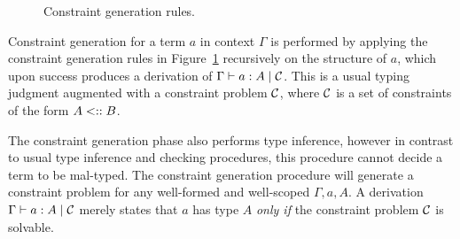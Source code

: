 \documentclass[pdflatex,sn-mathphys-num]{sn-jnl}%
\theoremstyle{thmstyleone}%
\theoremstyle{thmstyletwo}%
\theoremstyle{thmstylethree}%
\begin{document}
\begin{figure}[tb]
\begin{mathpar}


  \end{mathpar}

  \caption{Constraint generation rules.}
  \label{fig:constraint-generation-rules}
\end{figure}

Constraint generation for a term $a$ in context $\Gamma$ is performed by applying the constraint generation rules in Figure~\ref{fig:constraint-generation-rules} recursively on the structure of $a$, which upon success produces a derivation of $\Gamma \vdash a : A \mid \mathcal{C}$.
This is a usual typing judgment augmented with a constraint problem $\mathcal{C}$, where $\mathcal{C}$ is a set of constraints of the form $A \mathrel{<::} B$.

The constraint generation phase also performs type inference, however in contrast to usual type inference and checking procedures, this procedure cannot decide a term to be mal-typed.
The constraint generation procedure will generate a constraint problem for any well-formed and well-scoped $\Gamma, a, A$.
A derivation $\Gamma \vdash a : A \mid \mathcal{C}$ merely states that $a$ has type $A$ \textit{only if} the constraint problem $\mathcal{C}$ is solvable.
\end{document}
